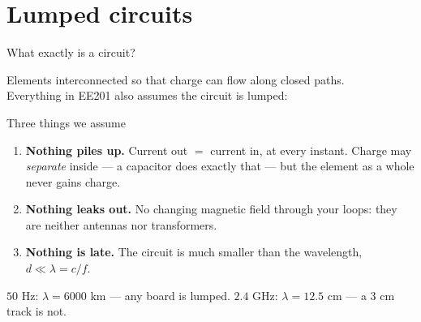 \documentclass[11pt,aspectratio=169]{beamer}
\begin{document}
\section{Lumped circuits}
\begin{frame}{What exactly is a circuit?}
  \vfill
  \begin{center}
    Elements interconnected so that charge can flow along \alert{closed paths}.\\[2pt]
    Everything in EE201 also assumes the circuit is \alert{lumped}:
  \end{center}
  \vfill
  \begin{block}{Three things we assume}
    \begin{enumerate}\itemsep0.55em
      \item \textbf{Nothing piles up.} Current out $=$ current in, at every instant.
            {\footnotesize Charge may \emph{separate} inside --- a capacitor does exactly
             that --- but the element as a whole never gains charge.}
      \item \textbf{Nothing leaks out.} No changing magnetic field through your loops:
            they are neither antennas nor transformers.
      \item \textbf{Nothing is late.} The circuit is much smaller than the wavelength,
            $d \ll \lambda = c/f$.
    \end{enumerate}
  \end{block}
  \vfill
  \begin{center}\footnotesize\color{metugray}
    $50$ Hz: $\lambda = 6000$ km --- any board is lumped. \qquad
    $2.4$ GHz: $\lambda = 12.5$ cm --- a $3$ cm track is not.
  \end{center}
  \vfill
\end{frame}
\end{document}
